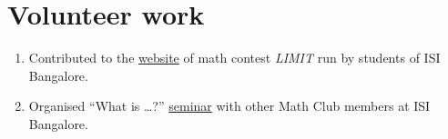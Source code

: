 \documentclass[a4paper, oneside, final]{scrartcl} %
\begin{document}
\section{Volunteer work}

\begin{enumerate}[label = $\bullet$]
  \item Contributed to the \href{https://www.limitisi.in}{website} of math contest \textit{LIMIT} run by students of ISI Bangalore.
  \item Organised ``What is \dots ?'' \href{https://mathclubisib.github.io/seminars/what_is/}{seminar} with other Math Club members at ISI Bangalore.

\end{enumerate}

\end{document}
